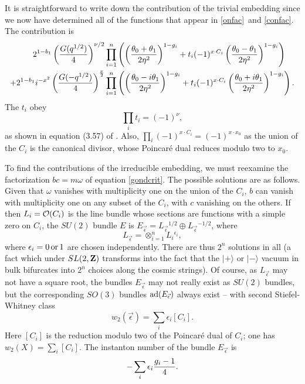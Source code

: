 \documentclass[12pt]{article}
\numberwithin{equation}{section}
\begin{document}
It is straightforward to write down the contribution of the trivial
embedding since we now have determined all of the functions that
appear in \eqref{onfac}\ and \eqref{confac}. The contribution is
\begin{equation}
  \label{heffo}
  \begin{aligned}2^{1-b_1} \left({G(q^{1/2})\over
    4}\right)^{\nu/2}&\prod_{i=1}^n \left(
      \left({\theta_0+\theta_1\over 2\eta^2}\right)^{1-g_i}
      +t_i(-1)^{x\cdot C_i} \left({\theta_0-\theta_1\over
    2\eta^2}\right)^{1-g_i}\right)\\ +2^{1-b_1}
    i^{-x^2}\left({G(-q^{1/2})\over 4}\right)^{{\nu\over
    2}}&\prod_{i=1}^n \left(\left( {\theta_0-i\theta_1\over
      2\eta^2}\right)^{1-g_i} +t_i(-1)^{x\cdot C_i}
    \left({\theta_0+i\theta_1\over 2\eta^2}\right)^{1-g_i}\right).\\
  \end{aligned}
\end{equation}
The $t_i$ obey
\begin{equation}
  \label{snon}
  \prod_it_i=(-1)^\nu,
\end{equation}
as shown in equation (3.57) of \cite{switten}.  Also,
$\prod_i(-1)^{x\cdot C_i}=(-1)^{x\cdot x_0}$ as the union of the $C_i$
is the canonical divisor, whose Poincar\'e dual reduces modulo two to $x_0$.

To find the contributions of the irreducible embedding, we must reexamine
the factorization
$bc=m\omega$ of equation \eqref{gondcrit}.  The possible solutions
are as follows. Given that $\omega$ vanishes
with multiplicity one on the union of the $C_i$, $b$ can
vanish with multiplicity one on any subset of the $C_i$, with $c$
vanishing on the others.  If then $L_i={\cal O}(C_i)$ is the line
bundle whose sections are functions with a simple zero on $C_i$,
the $SU(2)$ bundle $E$ is $E_{\vec\epsilon}=L_{\vec\epsilon}{}
^{1/2}\oplus L_{\vec\epsilon}{}^{-1/2}$, where
\begin{equation}
  \label{hsn}
  L_{\vec\epsilon}=\otimes_{i=1}^nL_i{}^{\epsilon_i},
\end{equation}
where $\epsilon_i=0\,{\rm or}\,1$ are chosen independently.
There are thus $2^n$ solutions in all
(a fact which under $SL(2,{\bf Z})$ transforms into the fact that
  the $|+\rangle$ or $|-\rangle$ vacuum in bulk bifurcates into $2^n$
choices along the cosmic strings).  Of course, as $L_{\vec\epsilon}$
may not have  a square root, the bundles $E_{\vec\epsilon}$ may not
really exist as $SU(2)$ bundles, but the corresponding $SO(3)$ bundles
${\rm ad}(E_{\vec\epsilon})$ always exist -- with second Stiefel-Whitney
class
\begin{equation}
  \label{ksm}
  w_{2}(\vec\epsilon)=\sum_i\epsilon_i[C_i].
\end{equation}
Here $[C_i]$ is the reduction modulo two of the Poincar\'e dual of
$C_i$; one has $w_2(X)=\sum_i[C_i]$.  The instanton  number of the bundle
$E_{\vec\epsilon}$ is
\begin{equation}
  \label{snl}
  -\sum_i\epsilon_i{g_i-1\over 4}.
\end{equation}
\end{document}
